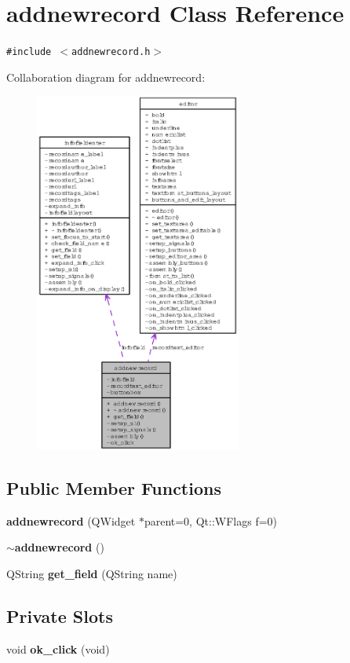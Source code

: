\section{addnewrecord Class Reference}
\label{classaddnewrecord}
{\tt \#include $<$addnewrecord.h$>$}

Collaboration diagram for addnewrecord:\begin{figure}[H]
\begin{center}
\leavevmode
\includegraphics[width=191pt]{classaddnewrecord__coll__graph}
\end{center}
\end{figure}
\subsection*{Public Member Functions}
\begin{CompactItemize}
\item 
{\bf addnewrecord} (QWidget $\ast$parent=0, Qt::WFlags f=0)
\item 
{\bf $\sim$addnewrecord} ()
\item 
QString {\bf get\_\-field} (QString name)
\end{CompactItemize}
\subsection*{Private Slots}
\begin{CompactItemize}
\item 
void {\bf ok\_\-click} (void)
\end{CompactItemize}
